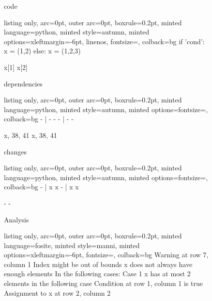 \begin{figure}[b]
 \begin{minipage}{0.32\textwidth}
 code
 \vspace{2pt}
  \begin{tcblisting}{listing only, 
    arc=0pt,
    outer arc=0pt, 
    boxrule=0.2pt,
    minted language=python,
    minted style=autumn,
    minted options={xleftmargin=-6pt, linenos, fontsize=\small},
    colback=bg }
if 'cond':
  x = (1,2)
else:
  x = (1,2,3)

x[1]
x[2]
\end{tcblisting}
 \end{minipage}
 \begin{minipage}{0.32\textwidth}
 dependencies
  \begin{tcblisting}{listing only, 
    arc=0pt,
    outer arc=0pt, 
    boxrule=0.2pt,
    minted language=python,
    minted style=autumn,
    minted options={fontsize=\small},
    colback=bg }
- | -
    - 
- | -
    -

x, 38, 41
x, 38, 41
\end{tcblisting}
 \end{minipage}
 \begin{minipage}{0.32\textwidth}
 changes
  \begin{tcblisting}{listing only, 
    arc=0pt,
    outer arc=0pt, 
    boxrule=0.2pt,
    minted language=python,
    minted style=autumn,
    minted options={fontsize=\small},
    colback=bg }
- | x
    x 
- | x
    x

-
-
\end{tcblisting}
 \end{minipage}
 \begin{minipage}{\textwidth}
  \vspace{4pt}
  Analysis
  \begin{tcblisting}{listing only, 
    arc=0pt,
    outer arc=0pt, 
    boxrule=0.2pt,
    minted language=fosite,
    minted style=manni,
    minted options={xleftmargin=-6pt, fontsize=\small},
    colback=bg }
Warning at row 7, column 1
  Index might be out of bounds
  x does not always have enough elements
  In the following cases:
  Case 1
    x has at most 2 elements in the following case
    Condition at row 1, column 1 is true
    Assignment to x at row 2, column 2
\end{tcblisting}
 \end{minipage}
 \label{lst:indexing2}
 \vspace{-30pt}
\end{figure}